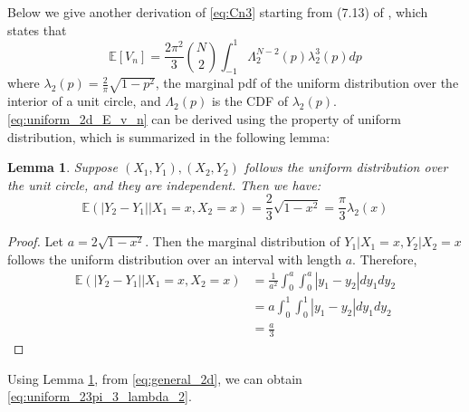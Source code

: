 \documentclass{article}
\newtheorem{lemma}{Lemma}
\def\E{\mathbb{E}}
\begin{document}
Below we give another derivation of
\eqref{eq:Cn3} starting from (7.13)
of \cite{efron1965convex}, which states that
\begin{equation}\label{eq:uniform_2d_E_v_n}
    \E[V_n] = \frac{2\pi^2}{3}\binom{N}{2}
    \int_{-1}^{1} \Lambda_2^{N-2}(p)\lambda_2^3(p)dp        
\end{equation}
where $\lambda_2(p) = \frac{2}{\pi}\sqrt{1-p^2}$, the marginal
pdf of the uniform distribution over the interior of a unit circle,
and $\Lambda_2(p)$ is the CDF of $\lambda_2(p)$.
\eqref{eq:uniform_2d_E_v_n} can be derived using the property of
uniform distribution, which is summarized in the following lemma:
\begin{lemma}\label{lem:uniform_abs_y_1_y_2}
    Suppose $(X_1, Y_1), (X_2, Y_2)$ follows the uniform distribution
    over the unit circle, and they are independent. Then we have:
    \begin{equation}\label{eq:uniform_23pi_3_lambda_2}
        \E(|Y_2-Y_1| \Big\vert X_1= x, X_2=x)
        = \frac{2}{3}\sqrt{1-x^2}
        =\frac{\pi}{3} \lambda_2(x)
    \end{equation}
\end{lemma}
\begin{proof}
    Let $a=2\sqrt{1-x^2}$. Then the marginal distribution
    of $Y_1|X_1=x, Y_2|X_2=x$ follows the uniform distribution over
    an interval with length $a$.
    Therefore,
    \begin{align*}
        \E(|Y_2-Y_1| \Big\vert X_1= x, X_2=x)
        &= \frac{1}{a^2} \int_0^a \int_0^a |y_1 - y_2| dy_1dy_2 \\
        &= a \int_0^1 \int_0^1 |y_1-y_2|dy_1dy_2 \\
        &=\frac{a}{3}
    \end{align*}
\end{proof}
Using Lemma \ref{lem:uniform_abs_y_1_y_2}, 
from \eqref{eq:general_2d}, we can obtain
\eqref{eq:uniform_23pi_3_lambda_2}.
\end{document}
